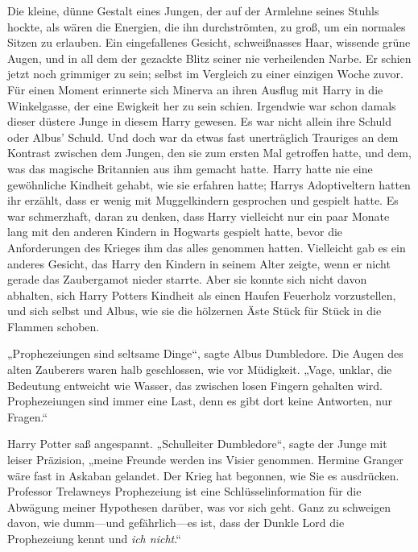 Die kleine, dünne Gestalt eines Jungen, der auf der Armlehne seines Stuhls hockte, als wären die Energien, die ihn durchströmten, zu groß, um ein normales Sitzen zu erlauben. Ein eingefallenes Gesicht, schweißnasses Haar, wissende grüne Augen, und in all dem der gezackte Blitz seiner nie verheilenden Narbe. Er schien jetzt noch grimmiger zu sein; selbst im Vergleich zu einer einzigen Woche zuvor. Für einen Moment erinnerte sich Minerva an ihren Ausflug mit Harry in die Winkelgasse, der eine Ewigkeit her zu sein schien. Irgendwie war schon damals dieser düstere Junge in diesem Harry gewesen. Es war nicht allein ihre Schuld oder Albus' Schuld. Und doch war da etwas fast unerträglich Trauriges an dem Kontrast zwischen dem Jungen, den sie zum ersten Mal getroffen hatte, und dem, was das magische Britannien aus ihm gemacht hatte. Harry hatte nie eine gewöhnliche Kindheit gehabt, wie sie erfahren hatte; Harrys Adoptiveltern hatten ihr erzählt, dass er wenig mit Muggelkindern gesprochen und gespielt hatte. Es war schmerzhaft, daran zu denken, dass Harry vielleicht nur ein paar Monate lang mit den anderen Kindern in Hogwarts gespielt hatte, bevor die Anforderungen des Krieges ihm das alles genommen hatten. Vielleicht gab es ein anderes Gesicht, das Harry den Kindern in seinem Alter zeigte, wenn er nicht gerade das Zaubergamot nieder starrte. Aber sie konnte sich nicht davon abhalten, sich Harry Potters Kindheit als einen Haufen Feuerholz vorzustellen, und sich selbst und Albus, wie sie die hölzernen Äste Stück für Stück in die Flammen schoben.

„Prophezeiungen sind seltsame Dinge“, sagte Albus Dumbledore. Die Augen des alten Zauberers waren halb geschlossen, wie vor Müdigkeit. „Vage, unklar, die Bedeutung entweicht wie Wasser, das zwischen losen Fingern gehalten wird. Prophezeiungen sind immer eine Last, denn es gibt dort keine Antworten, nur Fragen.“

Harry Potter saß angespannt. „Schulleiter Dumbledore“, sagte der Junge mit leiser Präzision, „meine Freunde werden ins Visier genommen. Hermine Granger wäre fast in Askaban gelandet. Der Krieg hat begonnen, wie Sie es ausdrücken. Professor Trelawneys Prophezeiung ist eine Schlüsselinformation für die Abwägung meiner Hypothesen darüber, was vor sich geht. Ganz zu schweigen davon, wie dumm—und gefährlich—es ist, dass der Dunkle Lord die Prophezeiung kennt und \emph{ich nicht}.“

